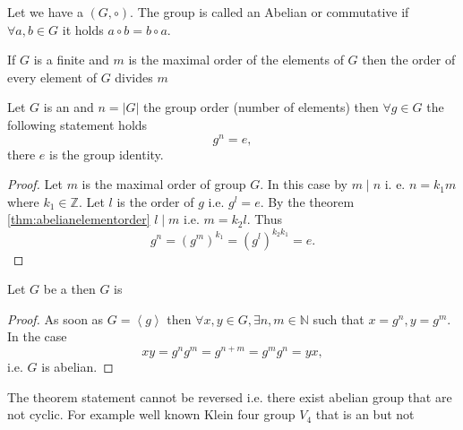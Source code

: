 \begin{appendices}
\begin{definition}
  Let we have a  $\left(G, \circ\right)$.
  The group is called an Abelian or commutative if
  $\forall a, b \in G$ it holds $a \circ b = b \circ a$.
  \label{def:abeliangroup}
\end{definition}

\begin{theorem}
  If $G$ is a finite  and $m$ is the maximal
  order of the elements of $G$ then the order of every element of $G$
  divides $m$ 
  \label{thm:abelianelementorder}
\end{theorem}

\begin{theorem}
  Let $G$ is an  and $n = \left|G\right|$
  the group order (number of elements) then $\forall g \in G$ the
  following statement holds
  \[
  g^n = e,
  \]
  there $e$ is the group identity.
  \begin{proof}
    Let $m$ is the maximal order of group $G$. In this case by
     $m \mid n$ i. e. $n = k_1 m$ where $k_1 \in
    \mathbb{Z}$. Let $l$ is the order of $g$ i.e. $g^l = e$. By the
    theorem \ref{thm:abelianelementorder} $l \mid m$ i.e.
    $m = k_2 l$. Thus
    \[
    g^n = \left(g^m\right)^{k_1} = 
    \left(g^l\right)^{k_2 k_1} = e.
    \]
  \end{proof}
  \label{thm:abelianelement}
\end{theorem}

\begin{theorem}
  Let $G$ be a  then $G$ is
  \label{thm:cyclic_group_is_abelian}
  \begin{proof}
    As soon as $G = \left<g\right>$ then
    $\forall x,y \in G, \exists n,m \in \mathbb{N}$ such that
    $x = g^n, y = g^m$. In the case
    \[
    xy = g^n g^m = g^{n+m} = g^m g^n = yx,
    \]
    i.e. $G$ is abelian. 
  \end{proof}
\end{theorem}

\begin{remark}
  The theorem statement cannot be reversed i.e. there exist abelian
  group that are not cyclic. For example well known Klein four group
  $V_4$ \cite{wiki:klein4group} that is an
   but not   
\end{remark}


\end{appendices}
